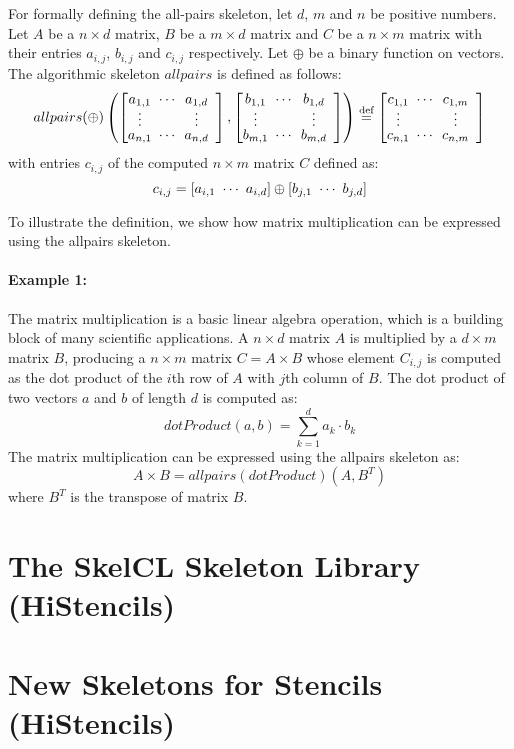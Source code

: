 For formally defining the all-pairs skeleton, let $d$, $m$ and $n$ be positive numbers.
  Let $A$ be a $n\times d$ matrix, $B$ be a $m\times d$ matrix and $C$ be a $n\times m$ matrix with their entries $a_{i,j}$, $b_{i,j}$ and $c_{i,j}$ respectively.
  Let $\oplus$ be a binary function on vectors. %
  The algorithmic skeleton $allpairs$ is defined as follows:
  \[
	  allpairs(\oplus)\left(\DottedMatrix{a_{1,1}}{a_{1,d}}{a_{n,1}}{a_{n,d}},%
	                           \DottedMatrix{b_{1,1}}{b_{1,d}}{b_{m,1}}{b_{m,d}}\right)%
  	\eqdef \DottedMatrix{c_{1,1}}{c_{1,m}}{c_{n,1}}{c_{n,m}}
  \]
  with entries $c_{i,j}$ of the computed $n\times m$ matrix $C$ defined as:
  \[
	  c_{i,j} = \left[a_{i,1}\ \cdots\ a_{i,d}\right] \oplus \left[b_{j,1}\ \cdots\ b_{j,d}\right]
  \]

To illustrate the definition, we show how matrix multiplication can be expressed using the allpairs skeleton.

\paragraph{Example 1:}
The matrix multiplication is a basic linear algebra operation, which is a building block of many scientific applications.
A $n\times d$ matrix $A$ is multiplied by a $d\times m$ matrix $B$, producing a $n\times m$ matrix $C=A\times B$ whose element $C_{i,j}$ is computed as the dot product of the $i$th row of $A$ with $j$th column of $B$.
The dot product of two vectors $a$ and $b$ of length $d$ is computed as:
\begin{equation}
  dotProduct(a,b) = \sum_{k=1}^d a_k \cdot b_k
\end{equation}
The matrix multiplication can be expressed using the allpairs skeleton as:
\begin{equation}
  A\times B = allpairs(dotProduct)\left(A, B^T\right)
  \label{eq:mat_mult_allpairs}
\end{equation}
where $B^T$ is the transpose of matrix $B$.






\section{The SkelCL Skeleton Library (HiStencils)}
\label{sec:skelcl}

\section{New Skeletons for Stencils (HiStencils)}
\label{sec:stencil}


